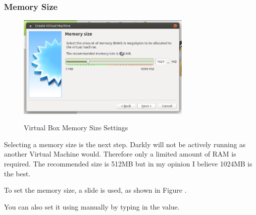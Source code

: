 \subsubsection{Memory Size}
\begin{figure}[!htb]
    \centering
    \includegraphics[width=0.752\textwidth]{images/00-02.png}\\[0cm]  
    \caption[Virtual Box]{Virtual Box Memory Size Settings}
    \label{fig:00-03 - Linux Virtual Box Memory Size} 
\end{figure}
Selecting a memory size is the next step. Darkly will not be actively running
as another Virtual Machine would. Therefore only a limited amount of RAM is
required. The recommended size is 512MB but in my opinion I believe 1024MB is
the best.

To set the memory size, a slide is used, as shown in Figure .

You can also set it using manually by typing in the value.

